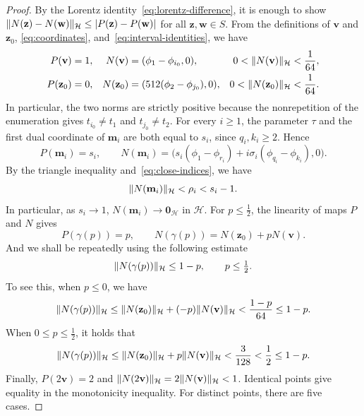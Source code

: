 \documentclass[11pt,a4paper]{article}
\theoremstyle{reportstyle}
\numberwithin{equation}{section}
\newcommand{\HH}{\mathcal H}
\newcommand{\bv}{\mathbf v}
\newcommand{\bz}{\mathbf z}
\newcommand{\bm}{\mathbf m}
\newcommand{\bw}{\mathbf w}
\newcommand{\bzero}{\mathbf 0}
\DeclarePairedDelimiter{\norm}{\lVert}{\rVert}
\DeclarePairedDelimiter{\abs}{\lvert}{\rvert}
\begin{document}
	\begin{proof}
		By the Lorentz identity~\eqref{eq:lorentz-difference}, it is enough to
		show $\norm{N(\bz)-N(\bw)}_{\HH} \le		\abs{P(\bz)-P(\bw)}$ for all $\bz,\bw\in S$.
		From the definitions of $\bv$ and $\bz_0$,
		\eqref{eq:coordinates}, and~\eqref{eq:interval-identities}, we have
		\begin{equation}
			\begin{aligned}
				P(\bv) & =1, & N(\bv) & =(\phi_1-\phi_{i_0},0), & 0<\norm{N(\bv)}_{\HH}<\frac1{64},\\
				P(\bz_0) & =0, & N(\bz_0) & =(512(\phi_2-\phi_{j_0}),0), & 0<\norm{N(\bz_0)}_{\HH}< \frac1{64}.
			\end{aligned}
			\label{eq:z0-lorentz}
		\end{equation}
		In particular, the two norms are strictly positive because the nonrepetition of the enumeration gives $t_{i_0}\neq t_1$ and $t_{j_0}\neq t_2$. For every $i\ge1$, the parameter $\tau$ and the first dual
		coordinate of $\bm_i$ are both equal to $s_i$, since
		$q_i,k_i\ge2$. Hence
		\begin{equation}
			P(\bm_i)=s_i, \qquad N(\bm_i) = \bigl( s_i(\phi_1-\phi_{r_i}) +i\sigma_i(\phi_{q_i}- \phi_{k_i}), 0 \bigr).
			\label{eq:mi-coordinates}
		\end{equation}
		By the triangle inequality and~\eqref{eq:close-indices}, we have
		\begin{equation}
			\norm{N(\bm_i)}_{\HH} <
			\rho_i < s_i-1.
			\label{eq:mi-small}
		\end{equation}
		In particular, as $s_i\rightarrow1$,  $N(\bm_i)\rightarrow\bzero_{\HH}$ in $\HH$. For $p\le\tfrac12$, the linearity of maps $P$ and $N$ gives
		$$P(\gamma(p))=p, \qquad N(\gamma(p))=N(\bz_0)+pN(\bv).$$
		And we shall be repeatedly using the following estimate
		\begin{equation}
			\norm{N(\gamma(p))}_{\HH}\le1-p,
			\qquad p\le\tfrac12.
			\label{eq:gamma-cone}
		\end{equation}
		To see this, when $p\le0$, we have
		$$ \norm{N(\gamma(p))}_{\HH} \le \norm{N(\bz_0)}_{\HH} +(-p)\norm{N(\bv)}_{\HH} < \frac{1-p}{64} \le1-p. $$
		When $0\le p\le\tfrac12$, it holds that
		$$ \norm{N(\gamma(p))}_{\HH} \le \norm{N(\bz_0)}_{\HH} +p\norm{N(\bv)}_{\HH} < \frac3{128} < \frac12 \le1-p. $$
		Finally, $P(2\bv)=2$ and $\norm{N(2\bv)}_{\HH} = 2\norm{N(\bv)}_{\HH} <1$.
		Identical points give equality in the monotonicity inequality.
		For distinct points, there are five cases. \vspace{0.3cm}


\end{proof}
\end{document}
